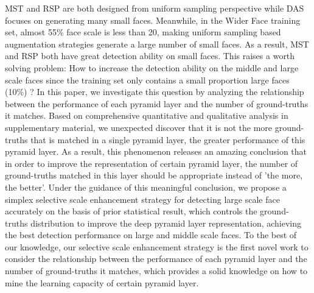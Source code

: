 \documentclass[10pt,twocolumn,letterpaper]{article}
\begin{document}
MST and RSP are both designed from uniform sampling perspective while DAS focuses on generating many small faces. Meanwhile, in the Wider Face training set, almost 55\% face scale is less than 20, making uniform sampling based augmentation strategies generate a large number of small faces. As a result, MST and RSP both have great detection ability on small faces. 
This raises a worth solving problem: How to increase the detection ability on the middle and large scale faces since the training set only contains a small proportion large faces (10\%) ?  
In this paper, we investigate this question by analyzing the relationship between the performance of each pyramid layer and the number of ground-truths it matches. 
Based on comprehensive quantitative and qualitative analysis in  supplementary material, we unexpected discover that it
 is not  the more ground-truths that is matched in a single pyramid layer, the greater performance of this pyramid layer.
 As a result, this phenomenon releases an amazing conclusion that in order to improve the representation of certain pyramid layer, the number of ground-truths matched in this layer should be appropriate instead of 'the more, the better'. Under the guidance of this meaningful conclusion, we propose a simplex selective scale enhancement strategy for detecting large scale face accurately on the basis of prior statistical result, which controls the ground-truths distribution  to improve the deep pyramid layer representation, achieving the best detection performance on large and middle scale faces. To the best of our knowledge, our selective scale enhancement strategy is the first novel work to consider the relationship between the performance of each pyramid layer and the number of ground-truths it matches, which provides a solid knowledge on how to mine the learning capacity of certain pyramid layer.
\end{document}
